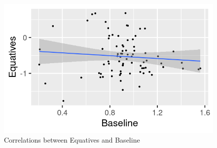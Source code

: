 \documentclass[
  ignorenonframetext,
]{beamer}
\begin{document}
\begin{frame}
\begin{figure}
\centering
\includegraphics{"equatives_baseline_corr.png"}
\caption{Correlations between Equatives and Baseline}
\end{figure}
\end{frame}
\end{document}
